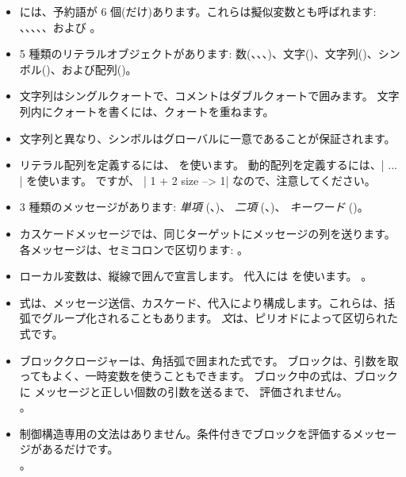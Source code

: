 \documentclass[a4paper,10pt,twoside]{book}
\begin{document}
\begin{itemize}

\item	\pharo には、予約語が 6 個(だけ)あります。これらは擬似変数とも呼ばれます: 、、、、、および 。

\item	5 種類のリテラルオブジェクトがあります: 数(、、、)、文字()、文字列()、シンボル()、および配列()。

\item	文字列はシングルクォートで、コメントはダブルクォートで囲みます。
		文字列内にクォートを書くには、クォートを重ねます。

\item	文字列と異なり、シンボルはグローバルに一意であることが保証されます。

\item	リテラル配列を定義するには、 を使います。
		動的配列を定義するには、\ct|{ ... }| を使います。
		 ですが、
		\ct|{ 1 + 2 } size --> 1|
		なので、注意してください。

\item	3 種類のメッセージがあります:
		\emph{単項} (\eg {}、)、
		\emph{二項} (\eg {}、)、
		\emph{キーワード} (\eg {})。

\item	カスケードメッセージでは、同じターゲットにメッセージの列を送ります。各メッセージは、セミコロンで区切ります:
。

\item	ローカル変数は、縦線で囲んで宣言します。
		代入には \ct{:=} を使います。
		。

\item	式は、メッセージ送信、カスケード、代入により構成します。これらは、括弧でグループ化されることもあります。
		\emph{文}は、ピリオドによって区切られた式です。

\item	ブロッククロージャーは、角括弧で囲まれた式です。
		ブロックは、引数を取ってもよく、一時変数を使うこともできます。
		ブロック中の式は、ブロックに  メッセージと正しい個数の引数を送るまで、
		評価されません。\\
		。

\item	制御構造専用の文法はありません。条件付きでブロックを評価するメッセージがあるだけです。\\
 		。

\end{itemize}

\ifx\wholebook\relax\else
\end{document}

